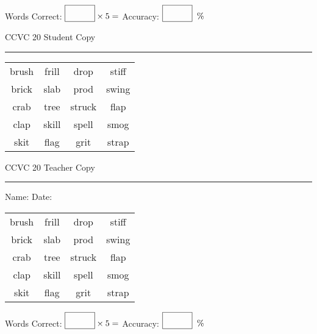 \documentclass{memoir}
\begin{document}
\normalsize

Words Correct: $\fbox{\phantom{\huge 100}} \times 5 = $ Accuracy: $\fbox{\phantom{\huge 100}}\;\; \%$ 

\vfill

\newpage



\footnotesize \noindent
CCVC 20 \hfill Student Copy
\smallskip
\hrule

\Large

\setlength{\tabcolsep}{14pt}
\def\arraystretch{3}

{\selectfont


\begin{vplace}[0.5]
\begin{center}
\begin{tabular}{cccc}
brush & frill & drop & stiff \\
brick       & slab             & prod & swing \\
crab        & tree & struck & flap            \\
clap             & skill & spell & smog \\
skit & flag             & grit      & strap \\
\end{tabular}
\end{center}
\end{vplace}

}

\newpage

\footnotesize \noindent
CCVC 20 \hfill Teacher Copy
\smallskip
\hrule

\normalsize

\vfill

\noindent
Name: \underline{\hspace{1.75in}} \hfill Date: \underline{\hspace{1in}}

\Large

{\selectfont


\begin{vplace}[0.5]
\begin{center}
\begin{tabular}{cccc}
brush & frill & drop & stiff \\
brick       & slab             & prod & swing \\
crab        & tree & struck & flap            \\
clap             & skill & spell & smog \\
skit & flag             & grit      & strap \\
\end{tabular}
\end{center}
\end{vplace}



}

\normalsize

Words Correct: $\fbox{\phantom{\huge 100}} \times 5 = $ Accuracy: $\fbox{\phantom{\huge 100}}\;\; \%$ 

\vfill

\end{document}
